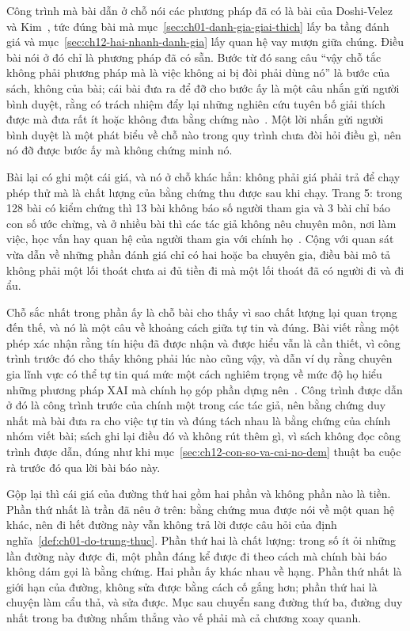 %
Công trình mà bài dẫn ở chỗ nói các phương pháp đã có là bài của Doshi-Velez và
Kim~\autocite{p14rigorous}, tức đúng bài mà
mục~\ref{sec:ch01-danh-gia-giai-thich} lấy ba tầng đánh giá và
mục~\ref{sec:ch12-hai-nhanh-danh-gia} lấy quan hệ vay mượn giữa chúng. Điều bài
nói ở đó chỉ là phương pháp đã có sẵn. Bước từ đó sang câu \enquote{vậy chỗ tắc
không phải phương pháp mà là việc không ai bị đòi phải dùng nó} là bước của
sách, không của bài; cái bài đưa ra để đỡ cho bước ấy là một câu nhắn gửi người
bình duyệt, rằng có trách nhiệm đẩy lại những nghiên cứu tuyên bố giải thích
được mà đưa rất ít hoặc không đưa bằng chứng
nào~\autocite{p24humangap}. Một lời nhắn gửi người bình duyệt là một phát biểu về
chỗ nào trong quy trình chưa đòi hỏi điều gì, nên nó đỡ được bước ấy mà không
chứng minh nó.

%
Bài lại có ghi một cái giá, và nó ở chỗ khác hẳn: không phải giá phải trả để
chạy phép thử mà là chất lượng của bằng chứng thu được sau khi chạy. Trang 5:
trong 128 bài có kiểm chứng thì 13 bài không báo số người tham gia và 3 bài chỉ
báo con số ước chừng, và ở nhiều bài thì các tác giả không nêu chuyên môn, nơi
làm việc, học vấn hay quan hệ của người tham gia với chính
họ~\autocite{p24humangap}. Cộng với quan sát vừa dẫn về những phần đánh giá chỉ
có hai hoặc ba chuyên gia, điều bài mô tả không phải một lối thoát chưa ai đủ
tiền đi mà một lối thoát đã có người đi và đi ẩu.

%
Chỗ sắc nhất trong phần ấy là chỗ bài cho thấy vì sao chất lượng lại quan trọng
đến thế, và nó là một câu về khoảng cách giữa tự tin và đúng. Bài viết rằng một
phép xác nhận rằng tín hiệu đã được nhận và được hiểu vẫn là cần thiết, vì công
trình trước đó cho thấy không phải lúc nào cũng vậy, và dẫn ví dụ rằng chuyên
gia lĩnh vực có thể tự tin quá mức một cách nghiêm trọng về mức độ họ hiểu những
phương pháp XAI mà chính họ góp phần dựng nên~\autocite{p24humangap}. Công trình
được dẫn ở đó là công trình trước của chính một trong các tác giả, nên bằng
chứng duy nhất mà bài đưa ra cho việc tự tin và đúng tách nhau là bằng chứng của
chính nhóm viết bài; sách ghi lại điều đó và không rút thêm gì, vì sách không
đọc công trình được dẫn, đúng như khi
mục~\ref{sec:ch12-con-so-va-cai-no-dem} thuật ba cuộc rà trước đó qua lời bài
báo này.

%
Gộp lại thì cái giá của đường thứ hai gồm hai phần và không phần nào là tiền.
Phần thứ nhất là trần đã nêu ở trên: bằng chứng mua được nói về một quan hệ
khác, nên đi hết đường này vẫn không trả lời được câu hỏi của
định nghĩa~\ref{def:ch01-do-trung-thuc}. Phần thứ hai là chất lượng: trong số ít
ỏi những lần đường này được đi, một phần đáng kể được đi theo cách mà chính bài
báo không dám gọi là bằng chứng. Hai phần ấy khác nhau về hạng. Phần thứ nhất là
giới hạn của đường, không sửa được bằng cách cố gắng hơn; phần thứ hai là chuyện
làm cẩu thả, và sửa được. Mục sau chuyển sang đường thứ ba, đường duy nhất trong
ba đường nhắm thẳng vào vế phải mà cả chương xoay quanh.
